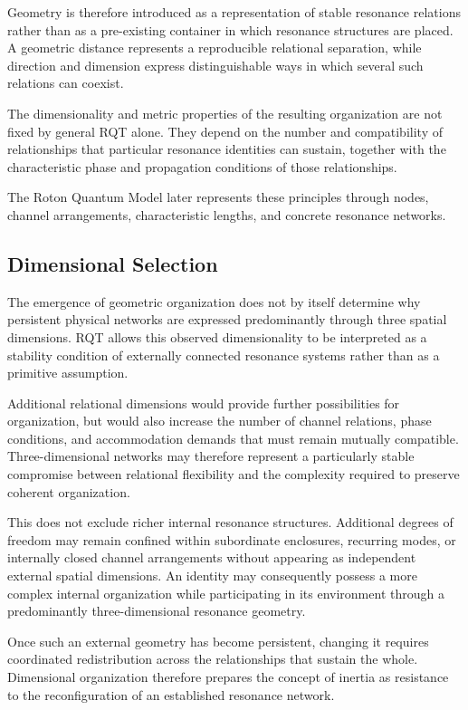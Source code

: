 \documentclass[11pt,a4paper]{article}
\begin{document}
Geometry is therefore introduced as a representation of stable resonance relations rather than as a pre-existing container in which resonance structures are placed. A geometric distance represents a reproducible relational separation, while direction and dimension express distinguishable ways in which several such relations can coexist.

The dimensionality and metric properties of the resulting organization are not fixed by general RQT alone. They depend on the number and compatibility of relationships that particular resonance identities can sustain, together with the characteristic phase and propagation conditions of those relationships.

The Roton Quantum Model later represents these principles through nodes, channel arrangements, characteristic lengths, and concrete resonance networks.


\subsection{Dimensional Selection}

The emergence of geometric organization does not by itself determine why persistent physical networks are expressed predominantly through three spatial dimensions. RQT allows this observed dimensionality to be interpreted as a stability condition of externally connected resonance systems rather than as a primitive assumption.

Additional relational dimensions would provide further possibilities for organization, but would also increase the number of channel relations, phase conditions, and accommodation demands that must remain mutually compatible. Three-dimensional networks may therefore represent a particularly stable compromise between relational flexibility and the complexity required to preserve coherent organization.

This does not exclude richer internal resonance structures. Additional degrees of freedom may remain confined within subordinate enclosures, recurring modes, or internally closed channel arrangements without appearing as independent external spatial dimensions. An identity may consequently possess a more complex internal organization while participating in its environment through a predominantly three-dimensional resonance geometry.

Once such an external geometry has become persistent, changing it requires coordinated redistribution across the relationships that sustain the whole. Dimensional organization therefore prepares the concept of inertia as resistance to the reconfiguration of an established resonance network.
\end{document}
